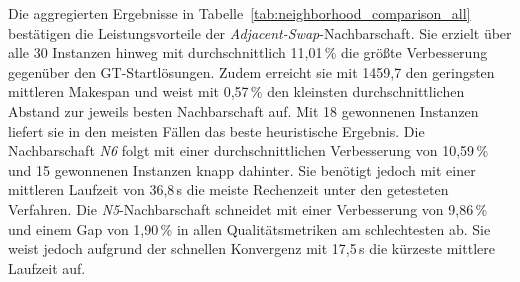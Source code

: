 \begin{table}[H]
    \centering
    \caption{Vergleich der Nachbarschaftsdefinitionen über alle 30 Classroom Instanzen mit einem Zeitlimit von 90\,s.}
    \label{tab:neighborhood_comparison_all}
\end{table}

Die aggregierten Ergebnisse in Tabelle~\ref{tab:neighborhood_comparison_all} bestätigen die Leistungsvorteile der \emph{Adjacent-Swap}-Nachbarschaft.
Sie erzielt über alle 30 Instanzen hinweg mit durchschnittlich 11,01\,\% die größte Verbesserung gegenüber den GT-Startlösungen.
Zudem erreicht sie mit 1459,7 den geringsten mittleren Makespan und weist mit 0,57\,\% den kleinsten durchschnittlichen Abstand zur jeweils besten Nachbarschaft auf.
Mit 18 gewonnenen Instanzen liefert sie in den meisten Fällen das beste heuristische Ergebnis.
Die Nachbarschaft \emph{N6} folgt mit einer durchschnittlichen Verbesserung von 10,59\,\% und 15 gewonnenen Instanzen knapp dahinter.
Sie benötigt jedoch mit einer mittleren Laufzeit von 36,8\,s die meiste Rechenzeit unter den getesteten Verfahren.
Die \emph{N5}-Nachbarschaft schneidet mit einer Verbesserung von 9,86\,\% und einem Gap von 1,90\,\% in allen Qualitätsmetriken am schlechtesten ab.
Sie weist jedoch aufgrund der schnellen Konvergenz mit 17,5\,s die kürzeste mittlere Laufzeit auf.

